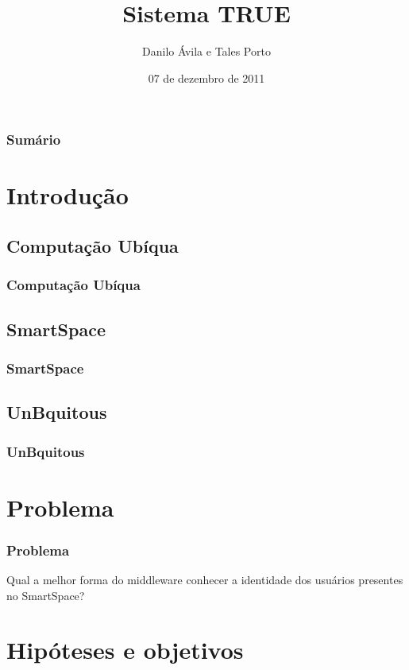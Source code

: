 \documentclass{beamer}
\title{Sistema TRUE}
\author{Danilo Ávila e Tales Porto}
\institute[UnB]
{
    Departamento de Ciência da Computação\\
    Instituto de Ciências Exatas\\
    Universidade de Brasília
}
\date{07 de dezembro de 2011}
\begin{document}
\begin{frame}
\titlepage
\end{frame}


\begin{frame}
	\frametitle{Sumário}
	\tableofcontents
\end{frame}


\section{Introdução}

	\subsection{Computação Ubíqua}
		\begin{frame}
	    	\frametitle{Computação Ubíqua}
		\end{frame}
		
	\subsection{SmartSpace}
		\begin{frame}
	    	\frametitle{SmartSpace}
		\end{frame}
		
	\subsection{UnBquitous}
		\begin{frame}
	    	\frametitle{UnBquitous}
		\end{frame}

\section{Problema}

	\begin{frame}
    	\frametitle{Problema}
    	Qual a melhor forma do middleware conhecer a identidade dos usuários
    	presentes no SmartSpace?
	\end{frame}

\section{Hipóteses e objetivos}
\end{document}
